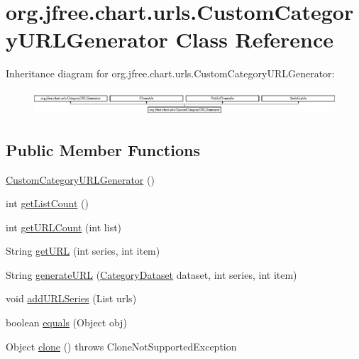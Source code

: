 \hypertarget{classorg_1_1jfree_1_1chart_1_1urls_1_1_custom_category_u_r_l_generator}{}\section{org.\+jfree.\+chart.\+urls.\+Custom\+Category\+U\+R\+L\+Generator Class Reference}
\label{classorg_1_1jfree_1_1chart_1_1urls_1_1_custom_category_u_r_l_generator}
Inheritance diagram for org.\+jfree.\+chart.\+urls.\+Custom\+Category\+U\+R\+L\+Generator\+:\begin{figure}[H]
\begin{center}
\leavevmode
\includegraphics[height=0.921053cm]{classorg_1_1jfree_1_1chart_1_1urls_1_1_custom_category_u_r_l_generator}
\end{center}
\end{figure}
\subsection*{Public Member Functions}
\begin{DoxyCompactItemize}
\item 
\mbox{\hyperlink{classorg_1_1jfree_1_1chart_1_1urls_1_1_custom_category_u_r_l_generator_a5eda1e0cfa88cccf0c0b19f2439be370}{Custom\+Category\+U\+R\+L\+Generator}} ()
\item 
int \mbox{\hyperlink{classorg_1_1jfree_1_1chart_1_1urls_1_1_custom_category_u_r_l_generator_a2e85041e0839f8a637b542ec67317a6b}{get\+List\+Count}} ()
\item 
int \mbox{\hyperlink{classorg_1_1jfree_1_1chart_1_1urls_1_1_custom_category_u_r_l_generator_a0e56c90081c2ef768edcbb8576922ab2}{get\+U\+R\+L\+Count}} (int list)
\item 
String \mbox{\hyperlink{classorg_1_1jfree_1_1chart_1_1urls_1_1_custom_category_u_r_l_generator_a6ca01cbfc9fb4489f3cc6abf20d65f90}{get\+U\+RL}} (int series, int item)
\item 
String \mbox{\hyperlink{classorg_1_1jfree_1_1chart_1_1urls_1_1_custom_category_u_r_l_generator_aaa0ee82568b286569930938ffa570aec}{generate\+U\+RL}} (\mbox{\hyperlink{interfaceorg_1_1jfree_1_1data_1_1category_1_1_category_dataset}{Category\+Dataset}} dataset, int series, int item)
\item 
void \mbox{\hyperlink{classorg_1_1jfree_1_1chart_1_1urls_1_1_custom_category_u_r_l_generator_ade9dcef0629fa8144c1100ec2ab481b6}{add\+U\+R\+L\+Series}} (List urls)
\item 
boolean \mbox{\hyperlink{classorg_1_1jfree_1_1chart_1_1urls_1_1_custom_category_u_r_l_generator_ac40ff1f3446f2ce1b1ba5de491841da8}{equals}} (Object obj)
\item 
Object \mbox{\hyperlink{classorg_1_1jfree_1_1chart_1_1urls_1_1_custom_category_u_r_l_generator_a9c3094c5d52b61920ea2721f44e71fac}{clone}} ()  throws Clone\+Not\+Supported\+Exception 
\end{DoxyCompactItemize}


